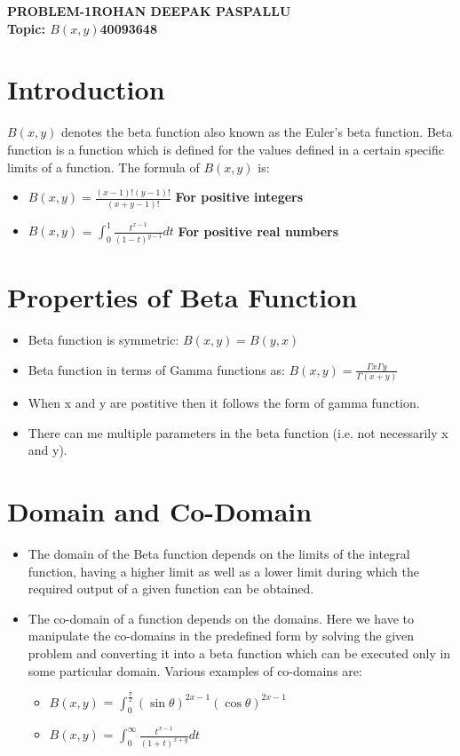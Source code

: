 \documentclass{report}
\begin{document}
\noindent
\Large\textbf{PROBLEM-1}\hfill\textbf{ROHAN DEEPAK PASPALLU}\\
\textbf{Topic: $B(x,y)$}\hfill\textbf{40093648}

\section*{Introduction}
    $B(x,y)$ denotes the beta function also known as the Euler’s beta function.
    Beta function is a function which is defined for the values defined in a certain specific limits of a function.
    The formula of \textbf{$B(x,y)$} is:
    \begin{itemize}
        \item $B(x,y) = \frac{(x-1)! (y-1)!}{(x+y-1)!}$ \textbf{For positive integers}\cite{wiki}
        \item $B(x,y)$ = $\int_{0}^{1} \frac{t^{x-1}}{(1-t)^{y-1}} dt$ \textbf{For positive real numbers}
    \end{itemize}

\section*{Properties of Beta Function}
    \begin{itemize}[noitemsep]
        \item Beta function is symmetric: $B(x,y) = B(y,x)$
        \item Beta function in terms of Gamma functions as:
            $B(x,y)=\frac{\Gamma x \Gamma y}{\Gamma (x+y)}$
        \item When x and y are postitive then it follows the form of gamma function.
        \item There can me multiple parameters in the beta function (i.e. not necessarily x and y).
    \end{itemize}
    
\section*{Domain and Co-Domain}
\begin{itemize}[noitemsep]
   \item The domain of the Beta function depends on the limits of the integral function, having a higher limit as well as a lower limit during which the required output of a given function can be obtained.
   \item The co-domain of a function depends on the domains. Here we have to manipulate the co-domains in the predefined form by solving the given problem and converting it into a beta function which can be executed only in some particular domain. Various examples of co-domains are:
    \begin{itemize}
        \item $B(x,y)$ = $\int_{0}^{\frac{\pi}{2}} (\sin \theta)^{2x-1} (\cos \theta)^{2x-1}$
        \item $B(x,y)$ = $\int_{0}^{\infty} \frac{t^{x-1}}{(1+t)^{x+y}} dt$
    \end{itemize}
    \end{itemize}
\newpage    
\end{document}
